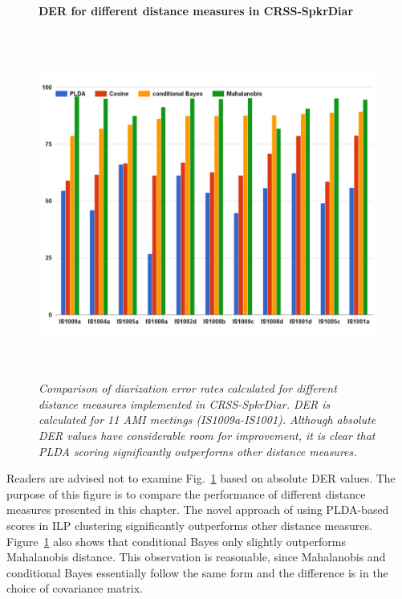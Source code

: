 \begin{figure}[h!]
	\vspace{2mm}
	\centering
	\textbf{DER for different distance measures in CRSS-SpkrDiar}\par\medskip
	\includegraphics[height = 4.5in, width=1\textwidth]{figures/crssdiar_distances_der}
	\caption{\it \small Comparison of diarization error rates calculated for different distance measures implemented in CRSS-SpkrDiar. DER is calculated for 11 AMI meetings (IS1009a-IS1001). Although absolute DER values have considerable room for improvement, it is clear that PLDA scoring significantly outperforms other distance measures.}
	\label{fig:compare_crssdiar_distances}
\end{figure}

Readers are advised not to examine Fig.~\ref{fig:compare_crssdiar_distances} based on absolute DER values. 
The purpose of this figure is to compare the performance of different distance measures presented in this chapter. 
The novel approach of using PLDA-based scores in ILP clustering significantly outperforms other distance measures. 
Figure~\ref{fig:compare_crssdiar_distances} also shows that conditional Bayes only slightly outperforms Mahalanobis distance. 
This observation is reasonable, since Mahalanobis and conditional Bayes essentially follow the same form and the difference is in the choice of covariance matrix. 

\newpage
